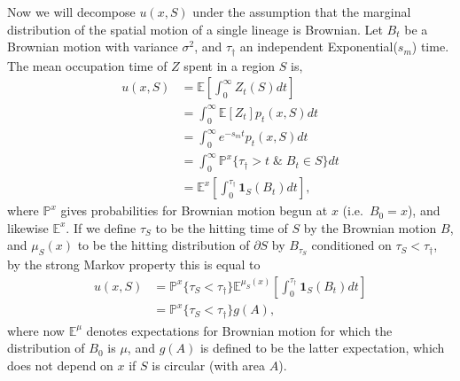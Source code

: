 \documentclass{article}
\renewcommand{\P}{\mathbb{P}}
\newcommand{\E}{\mathbb{E}}
\newcommand{\one}{\mathbf{1}}
\begin{document}
Now we will decompose $u(x,S)$ under the assumption that 
the marginal distribution of the spatial motion of a single lineage is Brownian.
Let $B_t$ be a Brownian motion with variance $\sigma^2$, 
and $\tau_\dagger$ an independent Exponential($s_m$) time.
The mean occupation time of $Z$ spent in a region $S$ is,
\begin{align}
    u(x,S) &= \E\left[\int_0^\infty Z_t(S) dt \right] \\
           &= \int_0^\infty \E[Z_t] p_t(x,S) dt \\
        &= \int_0^\infty e^{-s_m t} p_t(x,S) dt \\
        &= \int_0^\infty \P^x\{ \tau_\dagger > t \; \& \; B_t \in S \} dt \\
        &= \E^x\left[ \int_0^{\tau_\dagger} \one_S(B_t) dt \right]  ,
\end{align}
where $\P^x$ gives probabilities for Brownian motion begun at $x$ (i.e.\ $B_0=x$),
and likewise $\E^x$.
If we define
$\tau_S$ to be the hitting time of $S$ by the Brownian motion $B$,
and $\mu_S(x)$ to be the hitting distribution of $\partial S$ by $B_{\tau_S}$ conditioned on $\tau_S < \tau_\dagger$,
by the strong Markov property this is equal to
\begin{align}
    u(x,S) %
           &= \P^x\{ \tau_S < \tau_\dagger \}  \E^{\mu_S(x)}\left[ \int_0^{\tau_\dagger} \one_S(B_t) dt \right] \\
           &= \P^x\{ \tau_S < \tau_\dagger \}  g(A)  ,
\end{align}
where now $\E^\mu$ denotes expectations for Brownian motion for which the distribution of $B_0$ is $\mu$, 
and $g(A)$ is defined to be the latter expectation,
which does not depend on $x$ if $S$ is circular (with area $A$).
\end{document}
